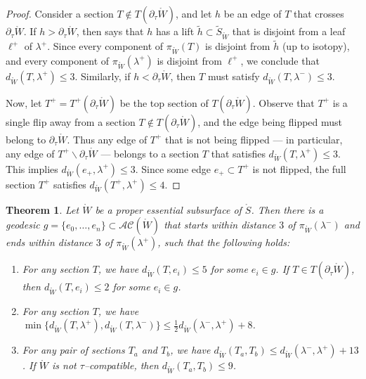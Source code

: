 \documentclass[11pt,letterpaper]{amsart}
\newcommand{\wt}{\widetilde}
\newcommand{\mr}{\mathring}
\newcommand{\bdy}{\partial} %
\newcommand{\psub}{\mr W}
\numberwithin{equation}{section}
\newtheorem{theorem}{Theorem}[section]
\theoremstyle{definition}
\renewcommand{\setminus}{\smallsetminus}
\newcommand{\AC}{\mathcal{AC}}
\newcommand{\dave}[1]{{\color{darkgreen}{#1}}}
\begin{document}
\begin{proof}
Consider a section $T \notin T(\bdy_\tau \psub)$, and let $h$ be an edge of $T$ that crosses $\partial_\tau \psub$.
 If $h > \bdy_\tau \psub$, then   says that $h$ has a lift $\widetilde h \subset \wt{S}_{\psub}$ that is disjoint from a leaf $\ell^+$ of $\lambda^+$. Since every component of $\pi_{\psub}(T)$ is disjoint from $\widetilde h$ (up to isotopy), and every component of $\pi_{\psub}(\lambda^+)$ is disjoint from $\ell^+$, we conclude that $d_{\psub}(T, \lambda^+) \leq 3$. 
Similarly, if $h < \bdy_\tau \psub$, then $T$ must satisfy  $d_{\psub}(T, \lambda^-) \leq 3$.

Now, let $T^+ = T^+(\bdy_\tau \psub)$ be the top section of $T(\bdy_\tau \psub)$. 
Observe that $T^+$ is a single flip away from a section $T \notin T(\bdy_\tau \psub)$, and the edge being flipped must belong to $\bdy_\tau \psub$. Thus any edge of $T^+$ that is not being flipped --- in particular, any edge of $T^+ \setminus \bdy_\tau \psub$ --- belongs to a section $T$ that satisfies $d_{\psub}(T, \lambda^+) \leq 3$. This implies $d_{\psub}(e_+, \lambda^+) \leq 3$. Since some edge $e_+ \subset T^+$ is not flipped, the full section $T^+$  satisfies $d_{\psub}(T^+, \lambda^+) \leq 4$.
\end{proof}



\begin{theorem}
\label{Thm:NicePath}
Let $\psub$ be a proper essential subsurface of  $\mr S$. Then there is a geodesic $g = \{ e_0, \ldots, e_n \} \subset \AC(\psub)$ that starts within distance $3$ of $\pi_{\psub}(\lambda^-)$ and ends within distance $3$ of $\pi_{\psub}(\lambda^+)$, such that the following holds:
\begin{enumerate}%
\item\label{Itm:ProjectedGeo} For any section $T$, we have $d_{\psub}(T, e_i) \leq 5$ for some $e_i \in g$. 
If $T \in T(\bdy_\tau \psub)$, then $d_{\psub}(T, e_i) \leq 2$ for some $e_i \in g$. 
\item\label{Itm:CloseToSomeLam} For any section $T$, we have $\min \{ d_{\psub}(T, \lambda^+), d_{\psub}(T, \lambda^-) \} \leq \frac{1}{2}d_{\psub}(\lambda^-, \lambda^+) + 8$.
\item\label{Itm:VeeringEfficiency} For any pair of sections $T_a$ and $T_b$, we have $d_{\psub}(T_a, T_b) \leq d_{\psub}(\lambda^-,\lambda^+)+13$. If $\psub$ is not $\tau$--compatible, then $d_{\psub}(T_a,T_b)\le 9$.
\end{enumerate}    
\end{theorem}
\end{document}
